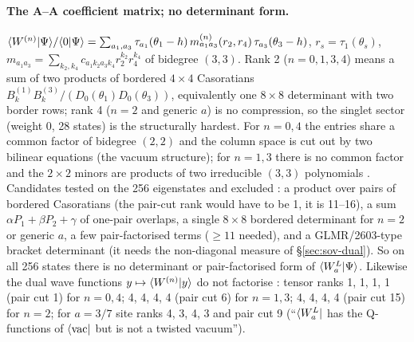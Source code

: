 \paragraph{The A--A coefficient matrix; no determinant form.} $\langle W^{(n)}|\Psi\rangle/\langle0|\Psi\rangle=\sum_{a_1,a_3}\tau_{a_1}(\theta_1-h)\,m^{(n)}_{a_1a_3}(r_2,r_4)\,\tau_{a_3}(\theta_3-h)$, $r_s=\tau_1(\theta_s)$,
$m_{a_1a_3}=\sum_{k_2,k_4}c_{a_1k_2a_3k_4}r_2^{k_2}r_4^{k_4}$ of bidegree $(3,3)$. Rank 2 ($n=0,1,3,4$) means a sum of two products of bordered $4\times4$ Casoratians $B^{(1)}_kB^{(3)}_k/(D_0(\theta_1)D_0(\theta_3))$, equivalently one $8\times8$ determinant
with two border rows; rank 4 ($n=2$ and generic $a$) is no compression, so the singlet sector (weight 0, 28 states) is the structurally hardest. For $n=0,4$ the entries share a common factor of bidegree $(2,2)$ and the column space is cut out by two bilinear
equations (the vacuum structure); for $n=1,3$ there is no common factor and the $2\times2$ minors are products of two irreducible $(3,3)$ polynomials \ex.
Candidates tested on the 256 eigenstates and excluded \hp: a product over pairs of bordered Casoratians (the pair-cut rank would have to be 1, it is 11--16), a sum $\alpha P_1+\beta P_2+\gamma$ of one-pair overlaps, a single $8\times8$ bordered determinant for $n=2$
or generic $a$, a few pair-factorised terms ($\ge11$ needed), and a GLMR/2603-type bracket determinant (it needs the non-diagonal measure of \S\ref{sec:sov-dual}). So on all 256 states there is no determinant or pair-factorised form of $\langle W_a^L|\Psi\rangle$.
Likewise the dual wave functions $y\mapsto\langle W^{(n)}|y\rangle$ do not factorise \ex: tensor ranks 1, 1, 1, 1 (pair cut 1) for $n=0,4$; 4, 4, 4, 4 (pair cut 6) for $n=1,3$; 4, 4, 4, 4 (pair cut 15) for $n=2$; for $a=3/7$ site ranks 4, 3, 4, 3 and pair cut 9
(``$\langle W_a^L|$ has the Q-functions of $\langle\mathrm{vac}|$ but is not a twisted vacuum'').

